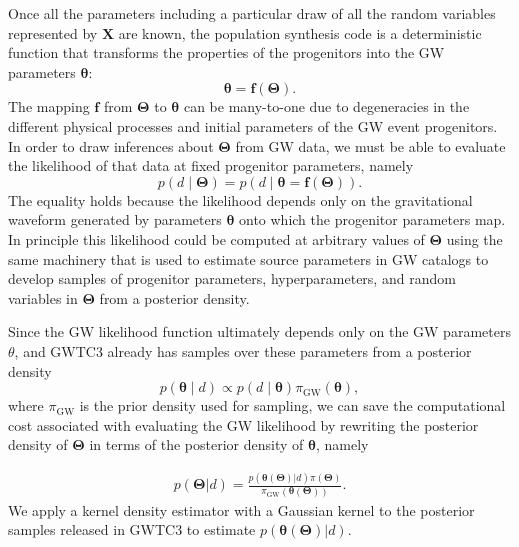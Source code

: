 \documentclass[twocolumn]{aastex631}
\begin{document}
Once all the parameters including a particular draw of all the random variables
represented by $\bm{X}$ are known, the population synthesis code is a
deterministic function that transforms the properties of the progenitors into
the GW parameters $\bm{\theta}$:
\begin{equation}
    \bm{\theta} = \bm{f}\left( \bm{\Theta} \right).
\end{equation}
The mapping $\bm{f}$ from $\bm{\Theta}$ to $\bm{\theta}$ can be many-to-one
due to degeneracies in the different physical processes and initial parameters
of the GW event progenitors.
In order to draw inferences about $\bm{\Theta}$ from GW data, we
must be able to evaluate the likelihood of that data at fixed progenitor
parameters, namely
\begin{equation}
    p\left( d \mid \bm{\Theta} \right) = p\left( d \mid \bm{\theta} = \bm{f}\left( \bm{\Theta} \right) \right).
\end{equation}
The equality holds because the likelihood depends only on the gravitational
waveform generated by parameters $\bm{\theta}$ onto which the progenitor
parameters map.  In principle this likelihood could be computed at arbitrary
values of $\bm{\Theta}$ using the same machinery that is used to estimate source
parameters in GW catalogs \citep{Veitch2015,Ashton2019,Romero-Shaw2020,GWTC-3}
to develop samples of progenitor parameters, hyperparameters, and random
variables in $\bm{\Theta}$ from a posterior density.

Since the GW likelihood function
ultimately depends only on the GW parameters $\theta$, and GWTC3 already has samples over these parameters from a posterior density
\begin{equation}
    p\left( \bm{\theta} \mid d \right) \propto p\left( d \mid \bm{\theta} \right) \pi_\mathrm{GW} \left( \bm{\theta} \right),
\end{equation}
where $\pi_\mathrm{GW}$ is the prior density used for sampling, we can save the
computational cost associated with evaluating the GW likelihood by rewriting the
posterior density of $\bm{\Theta}$ in terms of the posterior density of
$\bm{\theta}$, namely

\begin{align}
    p(\bm{\Theta} | d) = \frac{p(\bm{\theta}(\bm{\Theta})| d) \pi(\bm{\Theta})}{\pi_\mathrm{GW}(\bm{\theta}(\bm{\Theta}))}.
\end{align}
We apply a kernel density estimator with a Gaussian kernel to the posterior
samples released in GWTC3 to estimate $p(\bm{\theta}(\bm{\Theta})|d)$.
\end{document}
